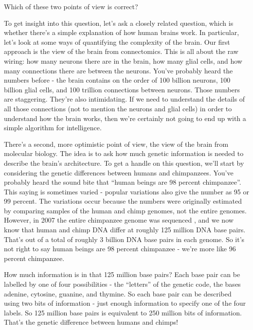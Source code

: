 Which of these two points of view is correct?

To get insight into this question, let's ask a closely related question, which is whether there's a simple explanation of how human brains work. In particular, let's look at some ways of quantifying the complexity of the brain. Our first approach is the view of the brain from connectomics\cite{wikipediaConnectomics2019}. This is all about the raw wiring: how many neurons there are in the brain, how many glial cells, and how many connections there are between the neurons. You've probably heard the numbers before - the brain contains on the order of 100 billion neurons, 100 billion glial cells, and 100 trillion connections between neurons. Those numbers are staggering. They're also intimidating. If we need to understand the details of all those connections (not to mention the neurons and glial cells) in order to understand how the brain works, then we're certainly not going to end up with a simple algorithm for intelligence.

There's a second, more optimistic point of view, the view of the brain from molecular biology. The idea is to ask how much genetic information is needed to describe the brain's architecture. To get a handle on this question, we'll start by considering the genetic differences between humans and chimpanzees. You've probably heard the sound bite that ``human beings are 98 percent chimpanzee''. This saying is sometimes varied - popular variations also give the number as 95 or 99 percent. The variations occur because the numbers were originally estimated by comparing samples of the human and chimp genomes, not the entire genomes. However, in 2007 the entire chimpanzee genome was sequenced \cite{ChimpanzeeSequencing2005,Varki2005}, and we now know that human and chimp DNA differ at roughly 125 million DNA base pairs. That's out of a total of roughly 3 billion DNA base pairs in each genome. So it's not right to say human beings are 98 percent chimpanzee - we're more like 96 percent chimpanzee.

How much information is in that 125 million base pairs? Each base pair can be labelled by one of four possibilities - the ``letters'' of the genetic code, the bases adenine, cytosine, guanine, and thymine. So each base pair can be described using two bits of information - just enough information to specify one of the four labels. So 125 million base pairs is equivalent to 250 million bits of information. That's the genetic difference between humans and chimps!

